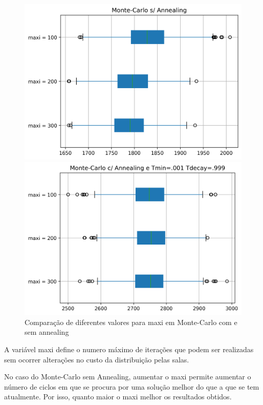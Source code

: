 \documentclass[a4paper]{report}
\begin{document}
\begin{figure}[h]
\centering
\begin{minipage}{.5\textwidth}
  \centering
  \includegraphics[width=.95\linewidth]{images/graph_comp_maxi_mc.png}
\end{minipage}%
\begin{minipage}{.5\textwidth}
  \centering
  \includegraphics[width=.95\linewidth]{images/graph_comp_maxi_sa.png}
\end{minipage}
    \caption{Comparação de diferentes valores para maxi em Monte-Carlo com e sem annealing}
\end{figure}

A variável maxi define o numero máximo de iterações que podem ser realizadas sem
ocorrer alterações no custo da distribuição pelas salas.

No caso do Monte-Carlo sem Annealing, aumentar o maxi permite aumentar o número
de ciclos em que se procura por uma solução melhor do que a que se tem
atualmente. Por isso, quanto maior o maxi melhor os resultados obtidos.
\end{document}
